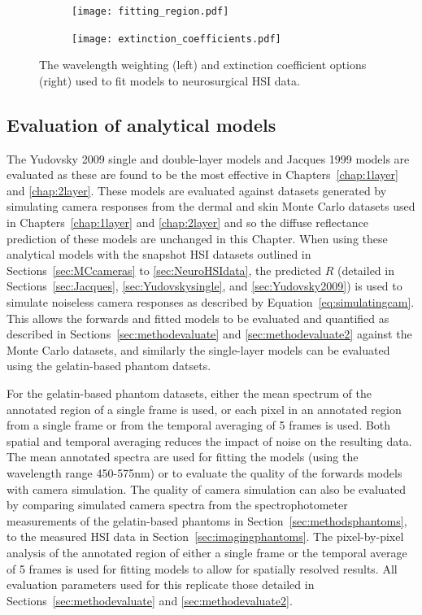 \begin{figure}[h!]
    \centering
    \begin{subfigure}{0.49\textwidth}
        \texttt{[image: fitting\_region.pdf]}
        \caption{}
        \label{fig:weightings}
    \end{subfigure}
    \begin{subfigure}{0.49\textwidth}
        \texttt{[image: extinction\_coefficients.pdf]}
        \caption{}
        \label{fig:extinctioncoeffs}
    \end{subfigure}
    \caption{The wavelength weighting (left) and extinction coefficient options (right) used to fit models to neurosurgical HSI data.}
    \label{fig:fittingoptions}
\end{figure}

\subsection{Evaluation of analytical models}
The Yudovsky 2009 single and double-layer models and Jacques 1999 models are evaluated as these are found to be the most effective in Chapters~\ref{chap:1layer} and \ref{chap:2layer}. These models are evaluated against datasets generated by simulating camera responses from the dermal and skin Monte Carlo datasets used in Chapters~\ref{chap:1layer} and \ref{chap:2layer} and so the diffuse reflectance prediction of these models are unchanged in this Chapter. When using these analytical models with the snapshot HSI datasets outlined in Sections~\ref{sec:MCcameras} to \ref{sec:NeuroHSIdata}, the predicted $R$ (detailed in Sections~\ref{sec:Jacques}, \ref{sec:Yudovskysingle}, and \ref{sec:Yudovsky2009}) is used to simulate noiseless camera responses as described by Equation~\eqref{eq:simulatingcam}. This allows the forwards and fitted models to be evaluated and quantified as described in Sections~\ref{sec:methodevaluate} and \ref{sec:methodevaluate2} against the Monte Carlo datasets, and similarly the single-layer models can be evaluated using the gelatin-based phantom datsets. 

For the gelatin-based phantom datasets, either the mean spectrum of the annotated region of a single frame is used, or each pixel in an annotated region from a single frame or from the temporal averaging of 5 frames is used. Both spatial and temporal averaging reduces the impact of noise on the resulting data. The mean annotated spectra are used for fitting the models (using the wavelength range 450-575nm) or to evaluate the quality of the forwards models with camera simulation. The quality of camera simulation can also be evaluated %
by comparing simulated camera spectra from the spectrophotometer measurements of the gelatin-based phantoms in Section~\ref{sec:methodsphantoms}, to the measured HSI data in Section~\ref{sec:imagingphantoms}. The pixel-by-pixel analysis of the annotated region of either a single frame or the temporal average of 5 frames is used for fitting models to allow for spatially resolved results. All evaluation parameters used for this replicate those detailed in Sections~\ref{sec:methodevaluate} and \ref{sec:methodevaluate2}.

